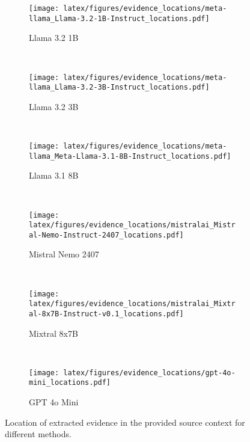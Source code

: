 \begin{figure*}[t]
    \centering
    \begin{subfigure}[t]{0.32\textwidth}
        \centering\texttt{[image: latex/figures/evidence\_locations/meta-llama\_Llama-3.2-1B-Instruct\_locations.pdf]}
    \caption{Llama 3.2 1B}
    \end{subfigure}
    ~
    \begin{subfigure}[t]{0.32\textwidth}
        \centering\texttt{[image: latex/figures/evidence\_locations/meta-llama\_Llama-3.2-3B-Instruct\_locations.pdf]}
    \caption{Llama 3.2 3B}
    \end{subfigure}
    ~
    \begin{subfigure}[t]{0.32\textwidth}
        \centering\texttt{[image: latex/figures/evidence\_locations/meta-llama\_Meta-Llama-3.1-8B-Instruct\_locations.pdf]}
        \caption{Llama 3.1 8B}
    \end{subfigure}
    \\
    \vspace{-3pt}
    \begin{subfigure}[t]{0.32\textwidth}
        \centering\texttt{[image: latex/figures/evidence\_locations/mistralai\_Mistral-Nemo-Instruct-2407\_locations.pdf]}
        \caption{Mistral Nemo 2407}
    \end{subfigure}
    ~
    \begin{subfigure}[t]{0.32\textwidth}
        \centering\texttt{[image: latex/figures/evidence\_locations/mistralai\_Mixtral-8x7B-Instruct-v0.1\_locations.pdf]}
        \caption{Mixtral 8x7B}
    \end{subfigure}
    ~
    \begin{subfigure}[t]{0.32\textwidth}
        \centering\texttt{[image: latex/figures/evidence\_locations/gpt-4o-mini\_locations.pdf]}
        \caption{GPT 4o Mini}
    \end{subfigure}
    
\caption{Location of extracted evidence in the provided source context for different methods.}
\label{fig:evidence_location}
\end{figure*}%
